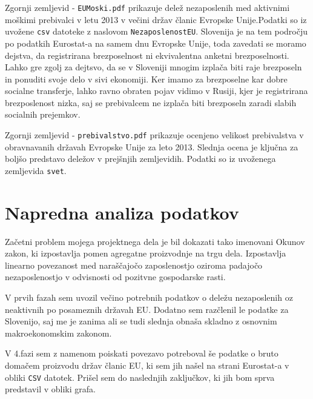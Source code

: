 \documentclass[11pt,a4paper]{article}
\begin{document}
Zgornji zemljevid - \verb|EUMoski.pdf| prikazuje delež nezaposlenih med aktivnimi moškimi prebivalci v letu 2013 v večini držav članic Evropske Unije.Podatki so iz uvožene \verb|csv| datoteke z naslovom \verb|NezaposlenostEU|. Slovenija je na tem področju po podatkih Eurostat-a na samem dnu Evropske Unije, toda zavedati se moramo dejstva, da registrirana brezposelnost ni ekvivalentna anketni brezposelnosti. Lahko gre zgolj za dejtsvo, da se v Sloveniji mnogim izplača biti raje brezposeln in ponuditi svoje delo v sivi ekonomiji. Ker imamo za brezposelne kar dobre socialne transferje, lahko ravno obraten pojav vidimo v Rusiji, kjer je registrirana brezposlenost nizka, saj se prebivalcem ne izplača biti brezposeln zaradi slabih socialnih prejemkov.


Zgornji zemljevid - \verb|prebivalstvo.pdf| prikazuje ocenjeno velikost prebivalstva v obravnavanih državah Evropske Unije za leto 2013. Slednja ocena je ključna za boljšo predstavo deležov v prejšnjih zemljevidih. Podatki so iz uvoženega zemljevida \verb|svet|. 

\pagebreak
\section{Napredna analiza podatkov}

Začetni problem mojega projektnega dela je bil dokazati tako imenovani Okunov zakon, ki izpostavlja pomen agregatne proizvodnje na trgu dela. Izpostavlja linearno povezanost med naraščajočo zaposlenostjo oziroma padajočo nezaposlenostjo v odvisnosti od pozitvne gospodarske rasti. 

V prvih fazah sem uvozil večino potrebnih podatkov o deležu nezaposlenih oz neaktivnih po posameznih državah EU. Dodatno sem razčlenil le podatke za Slovenijo, saj me je zanima ali se tudi slednja obnaša skladno z osnovnim makroekonomskim zakonom.

V 4.fazi sem z namenom poiskati povezavo potreboval še podatke o bruto domačem proizvodu držav članic EU, ki sem jih našel na strani Eurostat-a v obliki \verb|CSV| datotek. Prišel sem do naslednjih zaključkov, ki jih bom sprva predstavil v obliki grafa.
\end{document}
